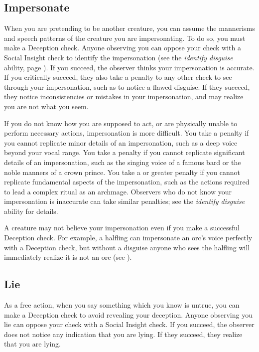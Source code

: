     \subsection{Impersonate}\label{Impersonate}
        When you are pretending to be another creature, you can assume the mannerisms and speech patterns of the creature you are impersonating.
        To do so, you must make a Deception check.
        Anyone observing you can oppose your check with a Social Insight check to identify the impersonation (see the \textit{identify disguise} ability, page ).
        If you succeed, the observer thinks your impersonation is accurate.
        If you critically succeed, they also take a  penalty to any other check to see through your impersonation, such as to notice a flawed disguise.
        If they succeed, they notice inconsistencies or mistakes in your impersonation, and may realize you are not what you seem.

        If you do not know how you are supposed to act, or are physically unable to perform necessary actions, impersonation is more difficult.
        You take a  penalty if you cannot replicate minor details of an impersonation, such as a deep voice beyond your vocal range.
        You take a  penalty if you cannot replicate significant details of an impersonation, such as the singing voice of a famous bard or the noble manners of a crown prince.
        You take a  or greater penalty if you cannot replicate fundamental aspects of the impersonation, such as the actions required to lead a complex ritual as an archmage.
        Observers who do not know your impersonation is inaccurate can take similar penalties; see the \textit{identify disguise} ability for details.

        A creature may not believe your impersonation even if you make a successful Deception check.
        For example, a halfling can impersonate an orc's voice perfectly with a Deception check, but without a disguise anyone who sees the halfling will immediately realize it is not an orc (see ).

    \subsection{Lie}
        As a free action, when you say something which you know is untrue, you can make a Deception check to avoid revealing your deception.
        Anyone observing you lie can oppose your check with a Social Insight check.
        If you succeed, the observer does not notice any indication that you are lying.
        If they succeed, they realize that you are lying.

